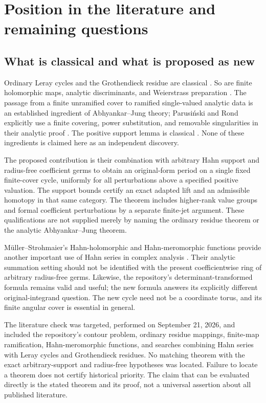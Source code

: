 \documentclass[11pt,letterpaper]{article}
\theoremstyle{definition}
\theoremstyle{remark}
\numberwithin{equation}{section}
\begin{document}
\section{Position in the literature and remaining questions}
\label{sec:scope}

\subsection{What is classical and what is proposed as new}
Ordinary Leray cycles and the Grothendieck residue are classical
\cite{GH,TN}. So are finite holomorphic maps, analytic discriminants, and
Weierstrass preparation \cite{GR}. The passage from a finite unramified
cover to ramified single-valued analytic data is an established ingredient
of Abhyankar--Jung theory; Parusi\'nski and Rond explicitly use a finite
covering, power substitution, and removable singularities in their analytic
proof \cite{PR}. The positive support lemma is classical
\cite{Neumann,Higman}. None of these ingredients is claimed here as an
independent discovery.

The proposed contribution is their combination with arbitrary Hahn support
and radius-free coefficient germs to obtain an original-form period on a
single fixed finite-cover cycle, uniformly for all perturbations above a
specified positive valuation. The support bounds certify an exact adapted
lift and an admissible homotopy in that same category. The theorem includes
higher-rank value groups and formal coefficient perturbations by a separate
finite-jet argument. These qualifications are not supplied merely by naming
the ordinary residue theorem or the analytic Abhyankar--Jung theorem.

M\"uller--Strohmaier's Hahn-holomorphic and Hahn-meromorphic functions provide
another important use of Hahn series in complex analysis \cite{MS}. Their
analytic summation setting should not be identified with the present
coefficientwise ring of arbitrary radius-free germs. Likewise, the
repository's determinant-transformed formula remains valid and useful; the
new formula answers its explicitly different original-integrand question.
The new cycle need not be a coordinate torus, and its finite angular cover
is essential in general.

The literature check was targeted, performed on September 21, 2026, and
included the repository's contour problem, ordinary residue mappings,
finite-map ramification, Hahn-meromorphic functions, and searches combining
Hahn series with Leray cycles and Grothendieck residues. No matching theorem
with the exact arbitrary-support and radius-free hypotheses was located.
Failure to locate a theorem does not certify historical priority. The claim
that can be evaluated directly is the stated theorem and its proof, not a
universal assertion about all published literature.
\end{document}
